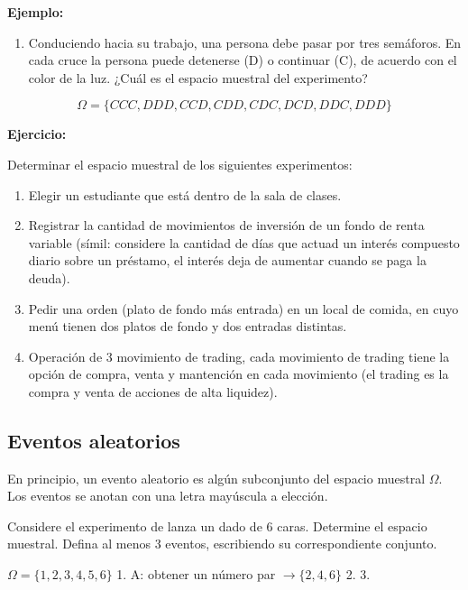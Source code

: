 \documentclass[
]{book}
\providecommand{\tightlist}{%
  \setlength{\itemsep}{0pt}\setlength{\parskip}{0pt}}
\begin{document}
\textbf{Ejemplo:}

\begin{enumerate}
\def\labelenumi{\arabic{enumi}.}
\tightlist
\item
  Conduciendo hacia su trabajo, una persona debe pasar por tres semáforos. En cada cruce la persona puede detenerse (D) o continuar (C), de acuerdo con el color de la luz. ¿Cuál es el espacio muestral del experimento?
\end{enumerate}

\[\Omega = \lbrace CCC, DDD, CCD, CDD, CDC, DCD, DDC, DDD \rbrace\]

\textbf{Ejercicio:}

Determinar el espacio muestral de los siguientes experimentos:

\begin{enumerate}
\def\labelenumi{\arabic{enumi}.}
\tightlist
\item
  Elegir un estudiante que está dentro de la sala de clases.
\item
  Registrar la cantidad de movimientos de inversión de un fondo de renta variable (símil: considere la cantidad de días que actuad un interés compuesto diario sobre un préstamo, el interés deja de aumentar cuando se paga la deuda).
\item
  Pedir una orden (plato de fondo más entrada) en un local de comida, en cuyo menú tienen dos platos de fondo y dos entradas distintas.
\item
  Operación de 3 movimiento de trading, cada movimiento de trading tiene la opción de compra, venta y mantención en cada movimiento (el trading es la compra y venta de acciones de alta liquidez).
\end{enumerate}

\hypertarget{eventos-aleatorios}{%
\subsection{Eventos aleatorios}\label{eventos-aleatorios}}

En principio, un evento aleatorio es algún subconjunto del espacio muestral \(\Omega\). Los eventos se anotan con una letra mayúscula a elección.

Considere el experimento de lanza un dado de 6 caras. Determine el espacio muestral. Defina al menos 3 eventos, escribiendo su correspondiente conjunto.

\(\Omega = \lbrace 1,2,3,4,5,6 \rbrace\)
1. A: obtener un número par \(\rightarrow \lbrace 2,4,6 \rbrace\)
2.
3.
\end{document}

